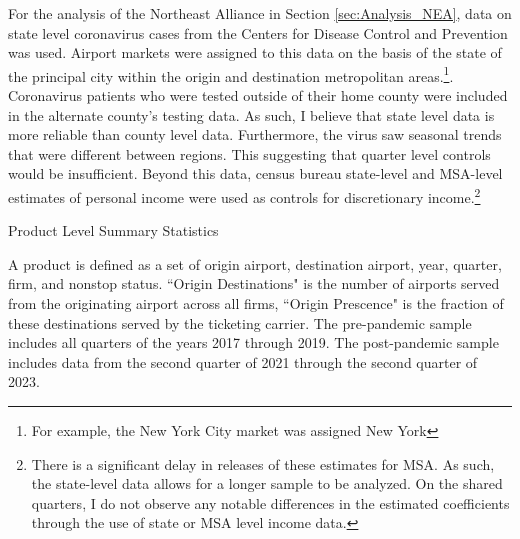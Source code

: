 \documentclass{article}
\begin{document}
	
	For the analysis of the Northeast Alliance in Section \ref{sec:Analysis_NEA}, data on state level coronavirus cases from the Centers for Disease Control and Prevention was used. Airport markets were assigned to this data on the basis of the state of the principal city within the origin and destination metropolitan areas.\footnote{For example, the New York City market was assigned New York}. Coronavirus patients who were tested outside of their home county were included in the alternate county's testing data. As such, I believe that state level data is more reliable than county level data. Furthermore, the virus saw seasonal trends that were different between regions. This suggesting that quarter level controls would be insufficient. Beyond this data, census bureau state-level and MSA-level estimates of personal income were used as controls for discretionary income.\footnote{There is a significant delay in releases of these estimates for MSA. As such, the state-level data allows for a longer sample to be analyzed. On the shared quarters, I do not observe any notable differences in the estimated coefficients through the use of state or MSA level income data.}

    \begin{table}
    \caption{Product Level Summary Statistics}
    \label{tab:Summary_Statistics_Product}
                    \vspace{-15mm}
                    \begin{center}
    
    \footnotesize{A product is defined as a set of origin airport, destination airport, year, quarter, firm, and nonstop status. ``Origin Destinations" is the number of airports served from the originating airport across all firms, ``Origin Prescence" is the fraction of these destinations served by the ticketing carrier. The pre-pandemic sample includes all quarters of the years 2017 through 2019. The post-pandemic sample includes data from the second quarter of 2021 through the second quarter of 2023.}
                    \end{center}
    \end{table}
\end{document}
